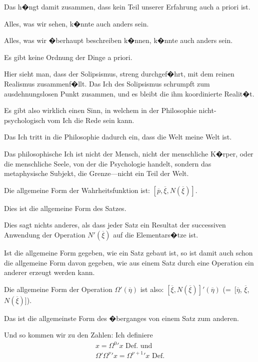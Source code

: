 \begin{propositions}
{Das h�ngt damit zusammen, dass kein Teil
unserer Erfahrung auch a priori ist.

Alles, was wir sehen, k�nnte auch anders
sein.

Alles, was wir �berhaupt beschreiben k�nnen,
k�nnte auch anders sein.

Es gibt keine Ordnung der Dinge a priori.}


{Hier sieht man, dass der Solipsismus, streng
durchgef�hrt, mit dem reinen Realismus zusammenf�llt.
Das Ich des Solipsismus schrumpft zum
ausdehnungslosen Punkt zusammen, und es bleibt
die ihm koordinierte Realit�t.}


{Es gibt also wirklich einen Sinn, in welchem in
der Philosophie nicht-psy\-cho\-lo\-gisch vom Ich die
Rede sein kann.

Das Ich tritt in die Philosophie dadurch ein,
dass die \glqq{}Welt meine Welt ist\grqq{}.

{\verystretchyspace
Das philosophische Ich ist nicht der Mensch,
nicht der menschliche K�rper, oder die menschliche
Seele, von der die Psychologie handelt, sondern das
metaphysische Subjekt, die Grenze---nicht ein Teil
der Welt.}}


{Die allgemeine Form der Wahrheitsfunktion ist:
$[\overline{p}, \overline{\xi}, N(\overline{\xi})]$.

Dies ist die allgemeine Form des Satzes.}


{Dies sagt nichts anderes, als dass jeder Satz ein
Resultat der successiven Anwendung der Operation
$N'(\overline{\xi})$ auf die Elementars�tze ist.}


{Ist die allgemeine Form gegeben, wie ein Satz
gebaut ist, so ist damit auch schon die allgemeine
Form davon gegeben, wie aus einem Satz durch
eine Operation ein anderer erzeugt werden
kann.}


{Die allgemeine Form der Operation $\Omega'(\overline{\eta})$ ist
also: $[\overline{\xi}, N(\overline{\xi})]'${}$(\overline{\eta})$ (=~[$\overline{\eta}$, $\overline{\xi}$, $N(\overline{\xi})$]).

Das ist die allgemeinste Form des �berganges
von einem Satz zum anderen.}


{Und so kommen wir zu den Zahlen: Ich definiere
\begin{gather*}
x = \Omega^{0}{}' x \text{ Def.\ und}\\
\Omega'\Omega^{\nu}{}'x = \Omega^{\nu+1}{}'x \text{ Def.}
\end{gather*}

}
\end{propositions}
